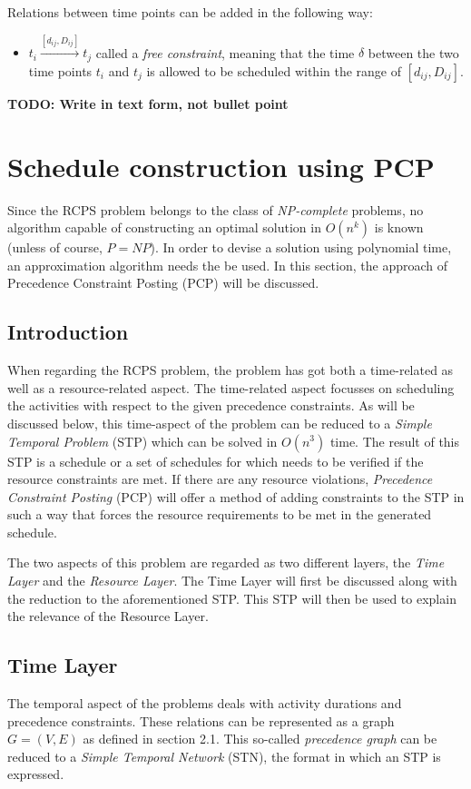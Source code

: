 \documentclass{article}
\newcommand{\TODO}[1]{{\color{red}\textbf{TODO: #1}}}
\begin{document}
Relations between time points can be added in the following way:
\begin{itemize}
\item $t_i \xrightarrow{[d_{ij},D_{ij}]} t_j$ called a \emph{free constraint}, meaning that the time $\delta$ between the two time points $t_i$ and $t_j$ is allowed to be scheduled within the range of $[d_{ij},D_{ij}]$.
\end{itemize}
\TODO{Write in text form, not bullet point}

\newpage
\section{Schedule construction using PCP}
\label{section:PCP}
Since the RCPS problem belongs to the class of \emph{NP-complete} problems, no algorithm capable of constructing an optimal solution in $O(n^k)$ is known (unless of course, $P=NP$). In order to devise a solution using polynomial time, an approximation algorithm needs the be used. In this section, the approach of Precedence Constraint Posting (PCP) will be discussed.

\subsection{Introduction}
When regarding the RCPS problem, the problem has got both a time-related as well as a resource-related aspect. 
The time-related aspect focusses on scheduling the activities with respect to the given precedence constraints. 
As will be discussed below, this time-aspect of the problem can be reduced to a \emph{Simple Temporal Problem} (STP) \cite{lombardi10} which can be solved in $O(n^3)$ time. 
The result of this STP is a schedule or a set of schedules for which needs to be verified if the resource constraints are met. 
If there are any resource violations, \emph{Precedence Constraint Posting} (PCP) will offer a method of adding constraints to the STP in such a way that forces the resource requirements to be met in the generated schedule. 

The two aspects of this problem are regarded as two different layers, the \emph{Time Layer} and the \emph{Resource Layer}.
The Time Layer will first be discussed along with the reduction to the aforementioned STP. 
This STP will then be used to explain the relevance of the Resource Layer.

\subsection{Time Layer}
The temporal aspect of the problems deals with activity durations and precedence constraints.
These relations can be represented as a graph $G=(V,E)$ as defined in section 2.1. 
This so-called \emph{precedence graph} can be reduced to a \emph{Simple Temporal Network} (STN), the format in which an STP is expressed.
\end{document}

